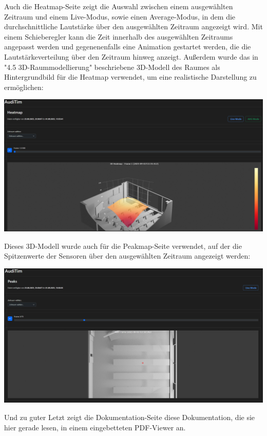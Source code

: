 Auch die Heatmap-Seite zeigt die Auswahl zwischen einem ausgewählten Zeitraum und einem Live-Modus, sowie einen Average-Modus, in dem die durchschnittliche Lautstärke über den ausgewählten Zeitraum angezeigt wird. 
Mit einem Schieberegler kann die Zeit innerhalb des ausgewählten Zeitraums angepasst werden und gegenenenfalls eine Animation gestartet werden, die die Lautstärkeverteilung über den Zeitraum hinweg anzeigt.
Außerdem wurde das in "4.5 3D-Raummodellierung" beschriebene 3D-Modell des Raumes als Hintergrundbild für die Heatmap verwendet, um eine realistische Darstellung zu ermöglichen:
\begin{center}
  \includegraphics[width=1\textwidth]{../images/UI/heatmap.png}
\end{center}

Dieses 3D-Modell wurde auch für die Peakmap-Seite verwendet, auf der die Spitzenwerte der Sensoren über den ausgewählten Zeitraum angezeigt werden:
\begin{center}
  \includegraphics[width=1\textwidth]{../images/UI/peak.png}
\end{center}

Und zu guter Letzt zeigt die Dokumentation-Seite diese Dokumentation, die sie hier gerade lesen, in einem eingebetteten PDF-Viewer an. 

